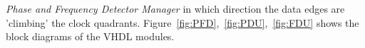 \documentclass[11pt]{article}
\renewcommand{\>}{\rangle} \renewcommand{\emptyset}{\varnothing}
\begin{document}
\textit{Phase and Frequency Detector Manager} in which direction the data edges
are 'climbing' the clock quadrants.
Figure~\ref{fig:PFD},~\ref{fig:PDU},~\ref{fig:FDU} shows the block diagrams of
the VHDL modules.
\end{document}
